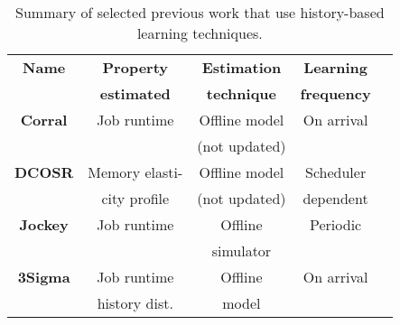\begin{table}[tp]
\caption{Summary of selected previous work that use history-based learning techniques.}
\label{table:prevwork}
\centering
{\small
\vspace{-0.1in}
\begin{tabular}{|c|c|c|c|c|}
\hline
		\textbf{ Name} & \textbf{Property} & \textbf{Estimation} & \textbf{Learning} \\ %
			& \textbf{estimated} & \textbf{technique} & \textbf{frequency} \\ %
	 
\hline	
	  \textbf{Corral } & Job runtime & Offline model & On arrival \\ %
	  \textbf{\cite{corral}} &  & (not updated) & \\%
\hline
	  \textbf{DCOSR} & Memory elasti- & Offline model & Scheduler \\ %
	  \textbf{\cite{DontCryOverSpilledRecords}}& city profile & (not updated) & dependent \\%
\hline
	  \textbf{Jockey} & Job runtime & Offline & Periodic \\ %
	  \textbf{\cite{jockey:eurosys2012}}& & simulator  &  \\%
\hline
	  \textbf{3Sigma} & Job runtime & Offline & On arrival \\ %
	  \textbf{\cite{3Sigma}} & history dist. & model &  \\%


\end{tabular}}
\end{table}
